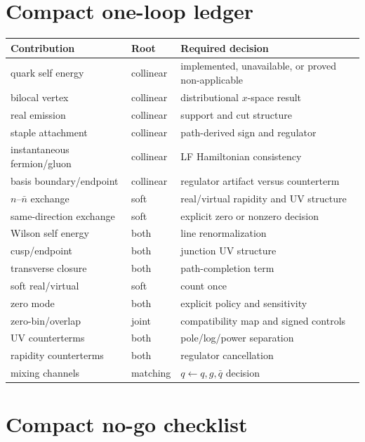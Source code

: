 \documentclass[11pt]{article}
\begin{document}
\section{Compact one-loop ledger}
\label{app:ledger}

\begin{longtable}{L{0.27\textwidth}L{0.18\textwidth}L{0.43\textwidth}}
\toprule
Contribution & Root & Required decision\\
\midrule
\endhead
quark self energy & collinear & implemented, unavailable, or proved non-applicable\\
bilocal vertex & collinear & distributional \(x\)-space result\\
real emission & collinear & support and cut structure\\
staple attachment & collinear & path-derived sign and regulator\\
instantaneous fermion/gluon & collinear & LF Hamiltonian consistency\\
basis boundary/endpoint & collinear & regulator artifact versus counterterm\\
\(n\)--\(\bar n\) exchange & soft & real/virtual rapidity and UV structure\\
same-direction exchange & soft & explicit zero or nonzero decision\\
Wilson self energy & both & line renormalization\\
cusp/endpoint & both & junction UV structure\\
transverse closure & both & path-completion term\\
soft real/virtual & soft & count once\\
zero mode & both & explicit policy and sensitivity\\
zero-bin/overlap & joint & compatibility map and signed controls\\
UV counterterms & both & pole/log/power separation\\
rapidity counterterms & both & regulator cancellation\\
mixing channels & matching & \(q\leftarrow q,g,\bar q\) decision\\
\bottomrule
\end{longtable}

\section{Compact no-go checklist}
\label{app:nogo}
\end{document}
